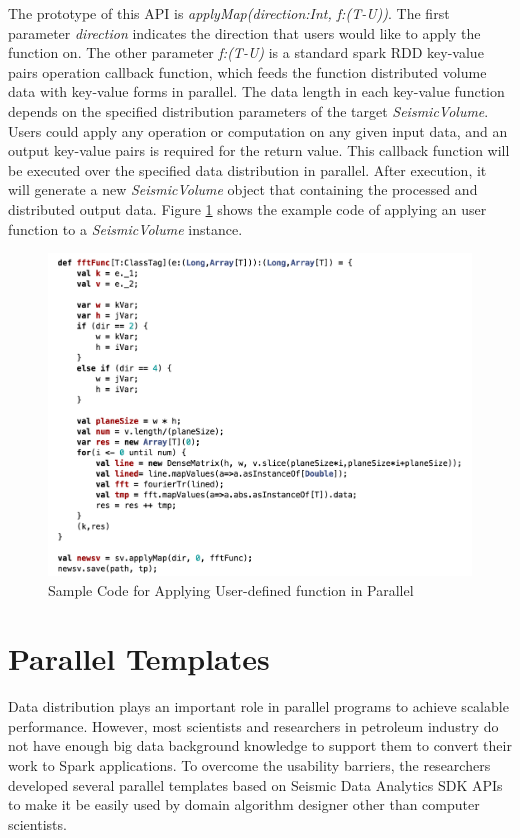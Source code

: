 The prototype of this API is \emph{applyMap(direction:Int, f:(T-U))}. The first parameter \emph{direction} indicates the direction that users would like to apply the function on. The other parameter \emph{f:(T-U)} is a standard spark RDD key-value pairs operation callback function, which feeds the function distributed volume data with key-value forms in parallel. The data length in each key-value function depends on the specified distribution parameters of the target \emph{SeismicVolume}.  Users could apply any operation or computation on any given input data, and an output key-value pairs is required for the return value. This callback function will be executed over the specified data distribution in parallel. After execution, it will generate a new \emph{SeismicVolume} object that containing the processed and distributed output data.  Figure \ref{code_apply} shows the example code of applying an user function to a \emph{SeismicVolume} instance.

\begin{figure}[h]
\centering
\includegraphics[scale=0.65]{figures/code_apply.png}
\caption{Sample Code for Applying User-defined function in Parallel}
\label{code_apply}
\end{figure}


\section{Parallel Templates}

Data distribution plays an important role in parallel programs to achieve scalable performance. However, most scientists and researchers in petroleum industry do not have enough big data background knowledge to support them to convert their work to Spark applications. To overcome the usability barriers, the researchers developed several parallel templates based on Seismic Data Analytics SDK APIs to make it be easily used by domain algorithm designer other than computer scientists.

